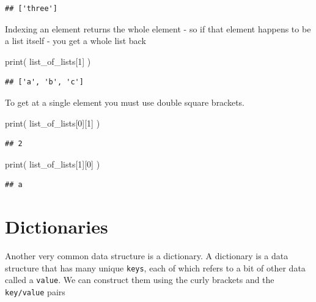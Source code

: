 \documentclass[]{book}
\newenvironment{Shaded}{\begin{snugshade}}{\end{snugshade}}
\newcommand{\BuiltInTok}[1]{#1}
\newcommand{\DecValTok}[1]{\textcolor[rgb]{0.00,0.00,0.81}{#1}}
\newcommand{\NormalTok}[1]{#1}
\theoremstyle{definition}
\theoremstyle{definition}
\theoremstyle{definition}
\theoremstyle{remark}
\begin{document}
\begin{verbatim}
## ['three']
\end{verbatim}

Indexing an element returns the whole element - so if that element
happens to be a list itself - you get a whole list back

\begin{Shaded}
\begin{Highlighting}[]
\BuiltInTok{print}\NormalTok{( list_of_lists[}\DecValTok{1}\NormalTok{] )}
\end{Highlighting}
\end{Shaded}

\begin{verbatim}
## ['a', 'b', 'c']
\end{verbatim}

To get at a single element you must use double square brackets.

\begin{Shaded}
\begin{Highlighting}[]
\BuiltInTok{print}\NormalTok{( list_of_lists[}\DecValTok{0}\NormalTok{][}\DecValTok{1}\NormalTok{] )}
\end{Highlighting}
\end{Shaded}

\begin{verbatim}
## 2
\end{verbatim}

\begin{Shaded}
\begin{Highlighting}[]
\BuiltInTok{print}\NormalTok{( list_of_lists[}\DecValTok{1}\NormalTok{][}\DecValTok{0}\NormalTok{] )}
\end{Highlighting}
\end{Shaded}

\begin{verbatim}
## a
\end{verbatim}

\hypertarget{dictionaries}{%
\section{Dictionaries}\label{dictionaries}}

Another very common data structure is a dictionary. A dictionary is a
data structure that has many unique \texttt{keys}, each of which refers
to a bit of other data called a \texttt{value}. We can construct them
using the curly brackets and the \texttt{key/value} pairs
\end{document}
